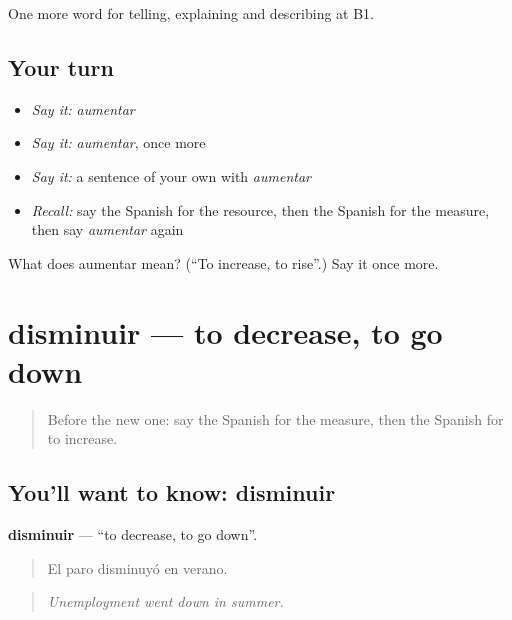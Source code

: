\begin{grammarlens}[title={What you've built}]
One more word for telling, explaining and describing at B1.
\end{grammarlens}

\subsection*{Your turn}
\begin{itemize}
\raggedright
  \item \emph{Say it:} \emph{aumentar}
  \item \emph{Say it:} \emph{aumentar}, once more
  \item \emph{Say it:} a sentence of your own with \emph{aumentar}
  \item \emph{Recall:} say the Spanish for the resource, then the Spanish for the measure, then say \emph{aumentar} again
\end{itemize}

\begin{tcolorbox}[breakable,colback=teal!4,colframe=teal!35!black,title={Before you move on}]
What does aumentar mean? (\textquotedblleft{}To increase, to rise\textquotedblright{}.) Say it once more.
\end{tcolorbox}
\section[disminuir]{disminuir — to decrease, to go down}

\label{lesson:ES-C608-disminuir}



\begin{quote}
Before the new one: say the Spanish for the measure, then the Spanish for to increase.
\end{quote}

\subsection*{You'll want to know: disminuir}
\textbf{disminuir} — \textquotedblleft{}to decrease, to go down\textquotedblright{}.

\begin{quote}
El paro disminuyó en verano.
\end{quote}

\begin{quote}
\emph{Unemployment went down in summer.}
\end{quote}

